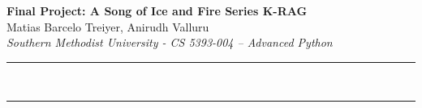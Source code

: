 \documentclass[a4paper,12pt]{article}
\renewenvironment{abstract}
 {\par\noindent\textbf{\abstractname}\ \ignorespaces \\}
 {\par\noindent\medskip}
\begin{document}
\pagestyle{fancy}
\thispagestyle{empty}
\fancyhead[R]{}
\fancyhead[L]{}
\renewcommand*{\thefootnote}{\fnsymbol{footnote}}
\vspace*{2cm}
\begin{center}
\Large{\textbf{Final Project: A Song of Ice and Fire Series K-RAG}}
\vspace{0.4cm}
\normalsize
\\ Matias Barcelo Treiyer, Anirudh Valluru \\
\vspace{0.1cm}
\textit{Southern Methodist University - CS 5393-004 – Advanced Python}
\medskip
\normalsize
\end{center}
{\color{gray}\hrule}
\vspace{0.4cm}
\begin{abstract}

\end{abstract}
{\color{gray}\hrule}
\vspace*{\fill}

\newpage
\tableofcontents
\bigskip






\end{document}
